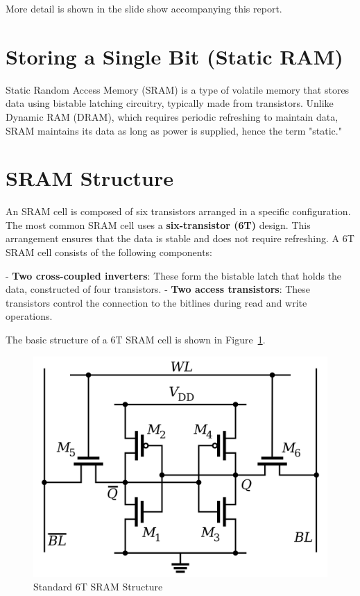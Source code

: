 More detail is shown in the slide show accompanying this report.

\section{Storing a Single Bit (Static RAM)}

Static Random Access Memory (SRAM) is a type of volatile memory that stores data using bistable latching circuitry, typically made from transistors. Unlike Dynamic RAM (DRAM), which requires periodic refreshing to maintain data, SRAM maintains its data as long as power is supplied, hence the term "static."

\section{SRAM Structure}

An SRAM cell is composed of six transistors arranged in a specific configuration. The most common SRAM cell uses a \textbf{six-transistor (6T)} design. This arrangement ensures that the data is stable and does not require refreshing. A 6T SRAM cell consists of the following components:

- \textbf{Two cross-coupled inverters}: These form the bistable latch that holds the data, constructed of four transistors.
- \textbf{Two access transistors}: These transistors control the connection to the bitlines during read and write operations.

The basic structure of a 6T SRAM cell is shown in Figure~\ref{fig:sram}.

\begin{figure}
  \centering
  \includegraphics[scale=0.15]{assets/sram.png}
  \caption{Standard 6T SRAM Structure}
  \label{fig:sram}
\end{figure}

